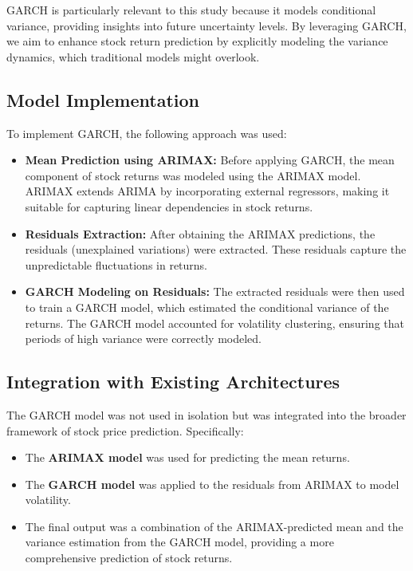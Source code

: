 GARCH is particularly relevant to this study because it models conditional variance, providing insights into future uncertainty levels. By leveraging GARCH, we aim to enhance stock return prediction by explicitly modeling the variance dynamics, which traditional models might overlook.

\subsection{Model Implementation}

To implement GARCH, the following approach was used:

\begin{itemize}
    \item \textbf{Mean Prediction using ARIMAX:} Before applying GARCH, the mean component of stock returns was modeled using the ARIMAX model. ARIMAX extends ARIMA by incorporating external regressors, making it suitable for capturing linear dependencies in stock returns.
    \item \textbf{Residuals Extraction:} After obtaining the ARIMAX predictions, the residuals (unexplained variations) were extracted. These residuals capture the unpredictable fluctuations in returns.
    \item \textbf{GARCH Modeling on Residuals:} The extracted residuals were then used to train a GARCH model, which estimated the conditional variance of the returns. The GARCH model accounted for volatility clustering, ensuring that periods of high variance were correctly modeled.
\end{itemize}

\subsection{Integration with Existing Architectures}

The GARCH model was not used in isolation but was integrated into the broader framework of stock price prediction. Specifically:

\begin{itemize}
    \item The \textbf{ARIMAX model} was used for predicting the mean returns.
    \item The \textbf{GARCH model} was applied to the residuals from ARIMAX to model volatility.
    \item The final output was a combination of the ARIMAX-predicted mean and the variance estimation from the GARCH model, providing a more comprehensive prediction of stock returns.
\end{itemize}

